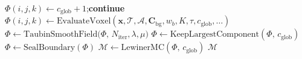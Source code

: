 \begin{algorithm}[t]
{{    $\Phi(i,j,k) \leftarrow c_{\mathrm{glob}}+1$;\quad \textbf{continue} 
  }
  $\Phi(i,j,k) \leftarrow \mathrm{EvaluateVoxel}(\mathbf{x}, \mathcal{T}, \mathcal{A}, \mathbf{C}_{\mathrm{bg}}, w_b, K, \tau, c_{\mathrm{glob}}, \dots)$
}
\BlankLine
$\Phi \leftarrow \mathrm{TaubinSmoothField}\bigl(\Phi,\, N_{\mathrm{iter}}, \lambda, \mu\bigr)$
$\Phi \leftarrow \mathrm{KeepLargestComponent}(\Phi,\,c_{\mathrm{glob}})$\;
$\Phi \leftarrow \mathrm{SealBoundary}(\Phi)$\;
$\mathcal{M} \leftarrow \mathrm{LewinerMC}(\Phi,\,c_{\mathrm{glob}})$ 
\Return $\mathcal{M}$\;
\end{algorithm}

